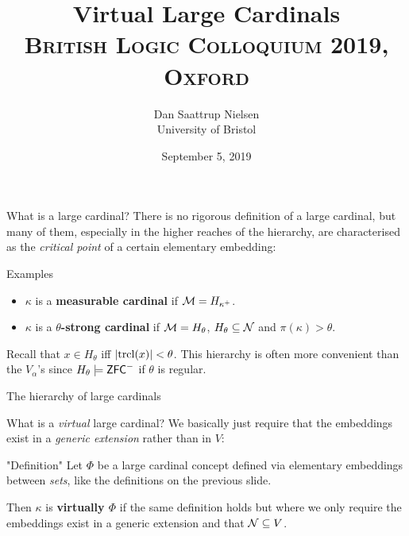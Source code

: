 


\title[Virtual Large Cardinals]{Virtual Large Cardinals\\ {\small\textsc{British Logic Colloquium 2019, Oxford}}}
\author[Dan Saattrup Nielsen]{Dan Saattrup Nielsen\\ University of Bristol}
\date{September 5, 2019}

\begin{frame}
	\titlepage
\end{frame}

\begin{frame}{What is a large cardinal?}
  There is no rigorous definition of a large cardinal\pause, but many of them, especially in the higher reaches of the hierarchy, are characterised as the \textit{critical point} of a certain elementary embedding:
  \eq{
    \pi\colon(\M,\in)\to(\N,\in)
  }

  \pause
  \begin{block}{Examples}
    \begin{itemize}
      \item $\kappa$ is a \textbf{measurable cardinal} if $\operatorname{\mathcal M}=H_{\kappa^+}$.
      \item $\kappa$ is a \textbf{$\theta$-strong cardinal} if $\operatorname{\mathcal M}=H_\theta$, $H_\theta\subseteq\operatorname{\mathcal N}$ and $\pi(\kappa)>\theta$.
    \end{itemize}
  \end{block}

  Recall that $x\in H_\theta$ iff $\left|\operatorname{trcl}(x)\right| < \theta$. This hierarchy is often more convenient than the $V_\alpha$'s since $H_\theta\models\textsf{ZFC}^-$ if $\theta$ is regular.
\end{frame}

{
\begin{frame}{The hierarchy of large cardinals}
\end{frame}}

\begin{frame}{What is a \emph{virtual} large cardinal?}
  We basically just require that the embeddings exist in a \emph{generic extension} rather than in $V$:

  \pause

  \begin{block}{"Definition"}
    Let $\Phi$ be a large cardinal concept defined via elementary embeddings between \textit{sets}, like the definitions on the previous slide.

    \pause

    Then $\kappa$ is \textbf{virtually $\Phi$} if the same definition holds but where we only require the embeddings exist in a generic extension and that $\operatorname{\mathcal N}\subseteq V$.
  \end{block}
\end{frame}

